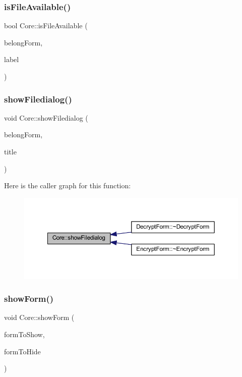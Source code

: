 \subsubsection{\texorpdfstring{is\+File\+Available()}{isFileAvailable()}\hspace{0.1cm}{\footnotesize\ttfamily [2/2]}}
{\footnotesize\ttfamily bool Core\+::is\+File\+Available (\begin{DoxyParamCaption}\item[{Q\+Widget $\ast$}]{belong\+Form,  }\item[{Q\+Line\+Edit $\ast$}]{label }\end{DoxyParamCaption})}

\hypertarget{class_core_adf62d4f996b0cb94dba269110b136dc1}{}\label{class_core_adf62d4f996b0cb94dba269110b136dc1} 
\subsubsection{\texorpdfstring{show\+Filedialog()}{showFiledialog()}}
{\footnotesize\ttfamily void Core\+::show\+Filedialog (\begin{DoxyParamCaption}\item[{Q\+Widget $\ast$}]{belong\+Form,  }\item[{Q\+String}]{title }\end{DoxyParamCaption})}

Here is the caller graph for this function\+:
\nopagebreak
\begin{figure}[H]
\begin{center}
\leavevmode
\includegraphics[width=350pt]{class_core_adf62d4f996b0cb94dba269110b136dc1_icgraph}
\end{center}
\end{figure}
\hypertarget{class_core_ad3503f8f37ca8f8f31bbdefb273a9f78}{}\label{class_core_ad3503f8f37ca8f8f31bbdefb273a9f78} 
\subsubsection{\texorpdfstring{show\+Form()}{showForm()}}
{\footnotesize\ttfamily void Core\+::show\+Form (\begin{DoxyParamCaption}\item[{Q\+Widget $\ast$}]{form\+To\+Show,  }\item[{Q\+Widget $\ast$}]{form\+To\+Hide }\end{DoxyParamCaption})}

